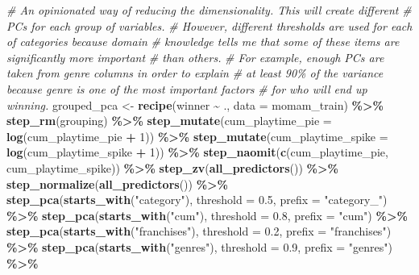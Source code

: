 \documentclass[
]{article}
\newenvironment{Shaded}{\begin{snugshade}}{\end{snugshade}}
\newcommand{\AttributeTok}[1]{\textcolor[rgb]{0.13,0.29,0.53}{#1}}
\newcommand{\CommentTok}[1]{\textcolor[rgb]{0.56,0.35,0.01}{\textit{#1}}}
\newcommand{\DecValTok}[1]{\textcolor[rgb]{0.00,0.00,0.81}{#1}}
\newcommand{\FloatTok}[1]{\textcolor[rgb]{0.00,0.00,0.81}{#1}}
\newcommand{\FunctionTok}[1]{\textcolor[rgb]{0.13,0.29,0.53}{\textbf{#1}}}
\newcommand{\NormalTok}[1]{#1}
\newcommand{\OtherTok}[1]{\textcolor[rgb]{0.56,0.35,0.01}{#1}}
\newcommand{\SpecialCharTok}[1]{\textcolor[rgb]{0.81,0.36,0.00}{\textbf{#1}}}
\newcommand{\StringTok}[1]{\textcolor[rgb]{0.31,0.60,0.02}{#1}}
\begin{document}
\begin{Shaded}
\begin{Highlighting}[]
\CommentTok{\# An opinionated way of reducing the dimensionality. This will create different}
\CommentTok{\# PCs for each group of variables.}
\CommentTok{\# However, different thresholds are used for each of categories because domain}
\CommentTok{\# knowledge tells me that some of these items are significantly more important}
\CommentTok{\# than others.}
\CommentTok{\# For example, enough PCs are taken from genre columns in order to explain}
\CommentTok{\# at least 90\% of the variance because genre is one of the most important factors}
\CommentTok{\# for who will end up winning.}
\NormalTok{grouped\_pca }\OtherTok{\textless{}{-}} \FunctionTok{recipe}\NormalTok{(winner }\SpecialCharTok{\textasciitilde{}}\NormalTok{ ., }\AttributeTok{data =}\NormalTok{ momam\_train) }\SpecialCharTok{\%\textgreater{}\%}
  \FunctionTok{step\_rm}\NormalTok{(grouping) }\SpecialCharTok{\%\textgreater{}\%}
  \FunctionTok{step\_mutate}\NormalTok{(}\AttributeTok{cum\_playtime\_pie =} \FunctionTok{log}\NormalTok{(cum\_playtime\_pie }\SpecialCharTok{+} \DecValTok{1}\NormalTok{)) }\SpecialCharTok{\%\textgreater{}\%}
  \FunctionTok{step\_mutate}\NormalTok{(}\AttributeTok{cum\_playtime\_spike =} \FunctionTok{log}\NormalTok{(cum\_playtime\_spike }\SpecialCharTok{+} \DecValTok{1}\NormalTok{)) }\SpecialCharTok{\%\textgreater{}\%}
  \FunctionTok{step\_naomit}\NormalTok{(}\FunctionTok{c}\NormalTok{(cum\_playtime\_pie, cum\_playtime\_spike)) }\SpecialCharTok{\%\textgreater{}\%}
  \FunctionTok{step\_zv}\NormalTok{(}\FunctionTok{all\_predictors}\NormalTok{()) }\SpecialCharTok{\%\textgreater{}\%}
  \FunctionTok{step\_normalize}\NormalTok{(}\FunctionTok{all\_predictors}\NormalTok{()) }\SpecialCharTok{\%\textgreater{}\%}
  \FunctionTok{step\_pca}\NormalTok{(}\FunctionTok{starts\_with}\NormalTok{(}\StringTok{"category"}\NormalTok{), }\AttributeTok{threshold =} \FloatTok{0.5}\NormalTok{, }\AttributeTok{prefix =} \StringTok{"category\_"}\NormalTok{) }\SpecialCharTok{\%\textgreater{}\%}
  \FunctionTok{step\_pca}\NormalTok{(}\FunctionTok{starts\_with}\NormalTok{(}\StringTok{"cum"}\NormalTok{), }\AttributeTok{threshold =} \FloatTok{0.8}\NormalTok{, }\AttributeTok{prefix =} \StringTok{"cum"}\NormalTok{) }\SpecialCharTok{\%\textgreater{}\%}
  \FunctionTok{step\_pca}\NormalTok{(}\FunctionTok{starts\_with}\NormalTok{(}\StringTok{"franchises"}\NormalTok{), }\AttributeTok{threshold =} \FloatTok{0.2}\NormalTok{, }\AttributeTok{prefix =} \StringTok{"franchises"}\NormalTok{) }\SpecialCharTok{\%\textgreater{}\%}
  \FunctionTok{step\_pca}\NormalTok{(}\FunctionTok{starts\_with}\NormalTok{(}\StringTok{"genres"}\NormalTok{), }\AttributeTok{threshold =} \FloatTok{0.9}\NormalTok{, }\AttributeTok{prefix =} \StringTok{"genres"}\NormalTok{) }\SpecialCharTok{\%\textgreater{}\%}

\end{Highlighting}
\end{Shaded}
\end{document}

